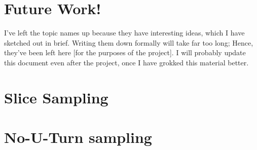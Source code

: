 \documentclass[titlepage]{article}
\begin{document}
\section{Future Work!}
I've left the topic names up because they have interesting ideas, which I have
sketched out in brief. Writing them down formally will take far too long; Hence,
they've been left here [for the purposes of the project]. I will probably update
this document even after the project, once I have grokked this material better.
\section{Slice Sampling}

\section{No-U-Turn sampling}
\end{document}
